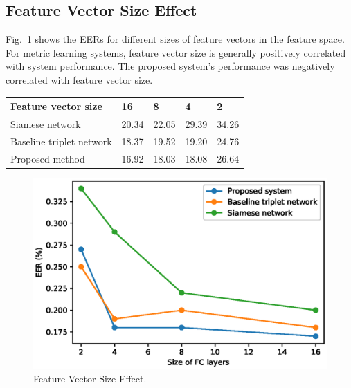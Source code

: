 \subsection{Feature Vector Size Effect}
Fig.~\ref{fclayer} shows the EERs for different sizes of feature vectors in the feature space. 
For metric learning systems, feature vector size is generally positively correlated with system performance.
The proposed system's performance was negatively correlated with feature vector size.
\begin{table}[]
    \centering
    \begin{tabular}{|l|l|l|l|l|}
    \hline
    Feature vector size        & 16    & 8     & 4     & 2     \\ \hline
    Siamese network            & 20.34 & 22.05 & 29.39 & 34.26 \\ \hline
    Baseline triplet network   & 18.37 & 19.52 & 19.20 & 24.76 \\ \hline
    Proposed method            & 16.92 & 18.03 & 18.08 & 26.64 \\ \hline
    \end{tabular}
\end{table}
\begin{figure}[!ht]
    \includegraphics[width=\textwidth]{fclayer_v1.eps}
    \caption{Feature Vector Size Effect.} \label{fclayer}
\end{figure}
